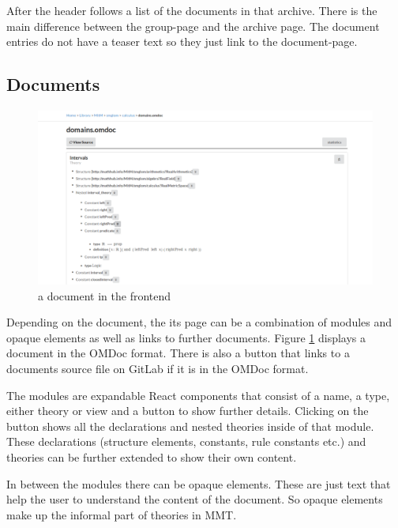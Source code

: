\documentclass[11pt,a4paper]{article}
\begin{document}
After the header follows a list of the documents in that archive.
There is the main difference between the group-page and the archive page.
The document entries do not have a teaser text so they just link to the document-page.

\subsection{Documents}
\begin{figure}[H]
\includegraphics[width=1\textwidth]{document.png}
\caption{a document in the frontend}
\label{fig:doc}
\end{figure}
Depending on the document, the its page can be a combination of modules and opaque elements as well as links to further documents.
Figure \ref{fig:doc} displays a document in the OMDoc format.
There is also a button that links to a documents source file on GitLab if it is in the OMDoc format.

The modules are expandable React components that consist of a name, a type, either theory or view and a button to show further details.
Clicking on the button shows all the declarations and nested theories inside of that module.
These declarations (structure elements, constants, rule constants etc.) and theories can be further extended to show their own content.

In between the modules there can be opaque elements.
These are just text that help the user to understand the content of the document.
So opaque elements make up the informal part of theories in MMT.
\end{document}
